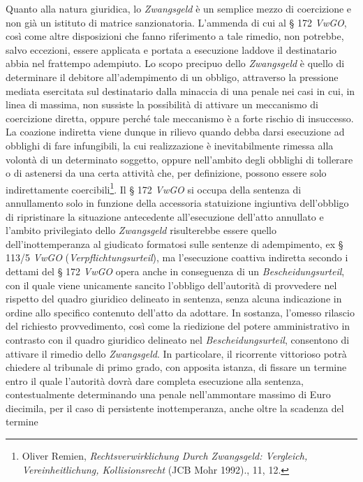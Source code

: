 \documentclass[12pt,it,a4paper,]{report}
\begin{document}
Quanto alla natura giuridica, lo \emph{Zwangsgeld} è un semplice mezzo
di coercizione e non già un istituto di matrice sanzionatoria. L'ammenda
di cui al § 172 \emph{VwGO}, così come altre disposizioni che fanno
riferimento a tale rimedio, non potrebbe, salvo eccezioni, essere
applicata e portata a esecuzione laddove il destinatario abbia nel
frattempo adempiuto. Lo scopo precipuo dello \emph{Zwangsgeld} è quello
di determinare il debitore all'adempimento di un obbligo, attraverso la
pressione mediata esercitata sul destinatario dalla minaccia di una
penale nei casi in cui, in linea di massima, non sussiste la possibilità
di attivare un meccanismo di coercizione diretta, oppure perché tale
meccanismo è a forte rischio di insuccesso. La coazione indiretta viene
dunque in rilievo quando debba darsi esecuzione ad obblighi di fare
infungibili, la cui realizzazione è inevitabilmente rimessa alla volontà
di un determinato soggetto, oppure nell'ambito degli obblighi di
tollerare o di astenersi da una certa attività che, per definizione,
possono essere solo indirettamente coercibili\footnote{{Oliver Remien,
  \emph{Rechtsverwirklichung Durch {Zwangsgeld}: {Vergleich},
  {Vereinheitlichung}, {Kollisionsrecht}} ({JCB Mohr} 1992).}, 11, 12.}.
Il § 172 \emph{VwGO} si occupa della sentenza di annullamento solo in
funzione della accessoria statuizione ingiuntiva dell'obbligo di
ripristinare la situazione antecedente all'esecuzione dell'atto
annullato e l'ambito privilegiato dello \emph{Zwangsgeld} risulterebbe
essere quello dell'inottemperanza al giudicato formatosi sulle sentenze
di adempimento, ex § 113/5 \emph{VwGO} (\emph{Verpflichtungsurteil}), ma
l'esecuzione coattiva indiretta secondo i dettami del § 172 \emph{VwGO}
opera anche in conseguenza di un \emph{Bescheidungsurteil}, con il quale
viene unicamente sancito l'obbligo dell'autorità di provvedere nel
rispetto del quadro giuridico delineato in sentenza, senza alcuna
indicazione in ordine allo specifico contenuto dell'atto da adottare. In
sostanza, l'omesso rilascio del richiesto provvedimento, così come la
riedizione del potere amministrativo in contrasto con il quadro
giuridico delineato nel \emph{Bescheidungsurteil}, consentono di
attivare il rimedio dello \emph{Zwangsgeld}. In particolare, il
ricorrente vittorioso potrà chiedere al tribunale di primo grado, con
apposita istanza, di fissare un termine entro il quale l'autorità dovrà
dare completa esecuzione alla sentenza, contestualmente determinando una
penale nell'ammontare massimo di Euro diecimila, per il caso di
persistente inottemperanza, anche oltre la scadenza del termine
\end{document}
